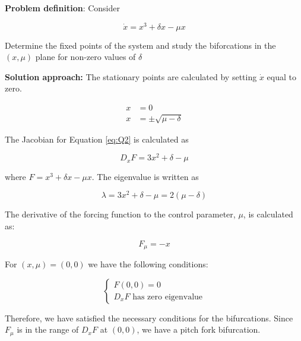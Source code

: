 \textbf{Problem definition}:
Consider

%
\begin{equation}\label{eq:Q2}
	\dot{x} = x^3 + \delta x - \mu x
\end{equation}
%

Determine the fixed points of the system and study the biforcations in the $(x, \mu)$ plane for non-zero values of $\delta$

\noindent\hrulefill

\textbf{Solution approach:} The stationary points are calculated by setting $\dot{x}$ equal to zero.

%
\begin{subequations}\label{eq:stationaryPoints}
\begin{align}
	x &= 0 \label{eq:stationary0}
	\\
	x &= \pm \sqrt{\mu - \delta} \label{eq:stationary1}
\end{align}
\end{subequations}
%

The Jacobian for Equation \eqref{eq:Q2} is calculated as

%
\begin{equation}\label{eq:jacobian}
	D_x F = 3x^2 + \delta - \mu
\end{equation}
%

where $F = x^3 + \delta x - \mu x$. The eigenvalue is written as

%
\begin{equation}\label{eq:eigenvalue}
	\lambda = 3x^2 + \delta - \mu = 2 \left( \mu - \delta \right)
\end{equation}
%

The derivative of the forcing function to the control parameter, $\mu$, is calculated as:

%
\begin{equation}
	F_\mu = -x
\end{equation}
%

For $(x, \mu) = (0, 0)$ we have the following conditions:

%
\begin{equation}
\begin{cases}
	F(0, 0) = 0 \\
	D_x F \text{ has zero eigenvalue}
\end{cases}
\end{equation}
%

Therefore, we have satisfied the necessary conditions for the bifurcations. Since $F_\mu$ is in the range of $D_x F$ at $(0,0)$, we have a pitch fork bifurcation.

